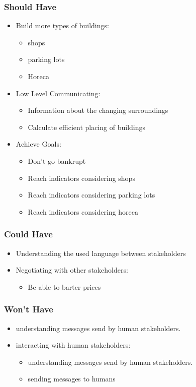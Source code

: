 \subsubsection{Should Have}
\begin{itemize}
	\item Build more types of buildings:
	\begin{itemize}
		\item shops
		\item parking lots
		\item Horeca
	\end{itemize}
	\item Low Level Communicating:
	\begin{itemize}
		\item Information about the changing surroundings
		\item Calculate efficient placing of buildings
	\end{itemize}
	\item Achieve Goals:
	\begin{itemize}
		\item Don’t go bankrupt
		\item Reach indicators considering shops
		\item Reach indicators considering parking lots
		\item Reach indicators considering horeca
	\end{itemize}
\end{itemize}

\subsubsection{Could Have}
\begin{itemize}
	\item Understanding the used language between stakeholders
	\item Negotiating with other stakeholders:
	\begin{itemize}
		\item Be able to barter prices
	\end{itemize}
\end{itemize}

\subsubsection{Won’t Have}
\begin{itemize}
	\item understanding messages send by human stakeholders.
	\item interacting with human stakeholders:
	\begin{itemize}
		\item understanding messages send by human stakeholders.
		\item sending messages to humans
	\end{itemize}
\end{itemize}

